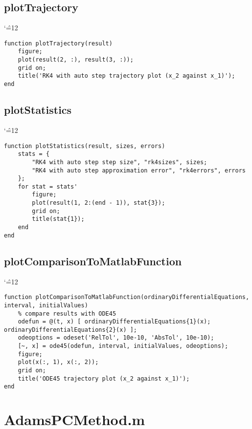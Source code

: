 \documentclass[12pt]{report}
\newenvironment{simplechar}{%
   \catcode`\^=12
}{}
\begin{document}
\subsection{plotTrajectory}
\begin{simplechar}
\begin{lstlisting}
function plotTrajectory(result)
    figure;
    plot(result(2, :), result(3, :));
    grid on;
    title('RK4 with auto step trajectory plot (x_2 against x_1)');
end
\end{lstlisting}
\end{simplechar}

\subsection{plotStatistics}
\begin{simplechar}
\begin{lstlisting}
function plotStatistics(result, sizes, errors)
    stats = {
        "RK4 with auto step step size", "rk4sizes", sizes;
        "RK4 with auto step approximation error", "rk4errors", errors
    };
    for stat = stats'
        figure;
        plot(result(1, 2:(end - 1)), stat{3});
        grid on;
        title(stat{1});
    end
end
\end{lstlisting}
\end{simplechar}

\subsection{plotComparisonToMatlabFunction}
\begin{simplechar}
\begin{lstlisting}
function plotComparisonToMatlabFunction(ordinaryDifferentialEquations, interval, initialValues)
    % compare results with ODE45
    odefun = @(t, x) [ ordinaryDifferentialEquations{1}(x); ordinaryDifferentialEquations{2}(x) ];
    odeoptions = odeset('RelTol', 10e-10, 'AbsTol', 10e-10);
    [~, x] = ode45(odefun, interval, initialValues, odeoptions);
    figure;
    plot(x(:, 1), x(:, 2));
    grid on;
    title('ODE45 trajectory plot (x_2 against x_1)');
end
\end{lstlisting}
\end{simplechar}

\section{AdamsPCMethod.m}
\end{document}
